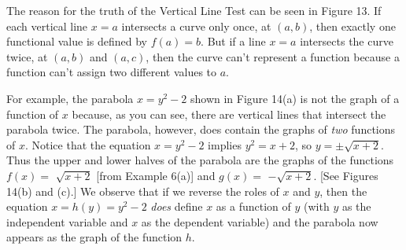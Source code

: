 \documentclass{sebase}
\begin{document}
\ENDBOX%

The reason for the truth of the Vertical Line Test can be seen in Figure 13.
If each vertical line $x=a$ intersects a curve only once, at $(a,b)$, then
exactly one functional value is defined by $f(a)=b$. But if a line $x=a$
intersects the curve twice, at $(a,b)$ and $(a,c)$, then the curve can't
represent a function because a function can't assign two different values to 
$a$.\\[6pt]
\hspace*{\fill}\hspace*{\fill}\vspace*{8pt%
}

For example, the parabola $x=y^{2}-2$ shown in Figure 14(a) is not the graph
of a function of $x$ because, as you can see, there are vertical lines that
intersect the parabola twice. The parabola, however, does contain the graphs
of \textit{two} functions of $x$. Notice that the equation $x=y^{2}-2$
implies $y^{2}=x+2$, so $y=\pm \sqrt{x+2}$. Thus the upper and lower halves
of the parabola are the graphs of the functions $f(x)=$ $\sqrt{x+2}$ [from
Example 6(a)] and $g(x)=$ $-\sqrt{x+2}$. [See Figures 14(b) and (c).] We
observe that if we reverse the roles of $x$ and $y$, then the equation $%
x=h(y)=y^{2}-2$ \textit{does} define $x$ as a function of $y$ (with $y$ as
the independent variable and $x$ as the dependent variable) and the parabola
now appears as the graph of the function $h$.

\vspace{12pt}\hskip-40pt\hfil%
%
\vspace{12pt}\hfil%
\end{document}
